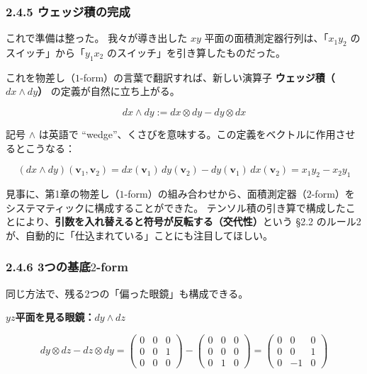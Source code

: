 \documentclass[a4paper,12pt,openany]{book}
\begin{document}
\hypertarget{ux30a6ux30a7ux30c3ux30b8ux7a4dux306eux5b8cux6210}{%
\subsubsection{2.4.5
ウェッジ積の完成}\label{ux30a6ux30a7ux30c3ux30b8ux7a4dux306eux5b8cux6210}}

これで準備は整った。 我々が導き出した \(xy\)
平面の面積測定器行列は、「\(x_1 y_2\) のスイッチ」から「\(y_1 x_2\)
のスイッチ」を引き算したものだった。

これを物差し（\(1\)-form）の言葉で翻訳すれば、新しい演算子
\textbf{ウェッジ積（}\(dx \wedge dy\)\textbf{）}
の定義が自然に立ち上がる。

\[
dx \wedge dy := dx \otimes dy - dy \otimes dx
\]

記号 \(\wedge\) は英語で
``wedge''、くさびを意味する。この定義をベクトルに作用させるとこうなる：

\[
(dx \wedge dy)(\mathbf{v}_1, \mathbf{v}_2) = dx(\mathbf{v}_1)\,dy(\mathbf{v}_2) - dy(\mathbf{v}_1)\,dx(\mathbf{v}_2) = x_1 y_2 - x_2 y_1
\]

見事に、第1章の物差し（\(1\)-form）の組み合わせから、面積測定器（\(2\)-form）をシステマティックに構成することができた。
テンソル積の引き算で構成したことにより、\textbf{引数を入れ替えると符号が反転する（交代性）}という
§2.2 のルール2が、自動的に「仕込まれている」ことにも注目してほしい。

\hypertarget{ux3064ux306eux57faux5e952-form}{%
\subsubsection{\texorpdfstring{2.4.6
3つの基底\(2\)-form}{2.4.6 3つの基底2-form}}\label{ux3064ux306eux57faux5e952-form}}

同じ方法で、残る2つの「偏った眼鏡」も構成できる。

\(yz\)\textbf{平面を見る眼鏡：}\(dy \wedge dz\)

\[
dy \otimes dz - dz \otimes dy = \begin{pmatrix} 0 & 0 & 0 \\ 0 & 0 & 1 \\ 0 & 0 & 0 \end{pmatrix} - \begin{pmatrix} 0 & 0 & 0 \\ 0 & 0 & 0 \\ 0 & 1 & 0 \end{pmatrix} = \begin{pmatrix} 0 & 0 & 0 \\ 0 & 0 & 1 \\ 0 & -1 & 0 \end{pmatrix}
\]
\end{document}
